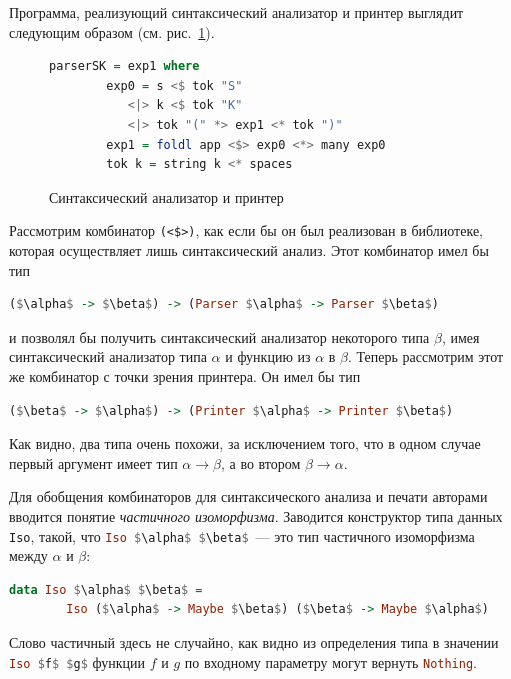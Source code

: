 Программа, реализующий синтаксический анализатор и принтер выглядит следующим образом (см. рис.~\ref{ppimpl}).

\begin{figure}[h]
\centering
\begin{lstlisting}[language=Haskell]
    parserSK = exp1 where
        exp0 = s <$ tok "S"
           <|> k <$ tok "K" 
           <|> tok "(" *> exp1 <* tok ")"
        exp1 = foldl app <$> exp0 <*> many exp0
        tok k = string k <* spaces    
\end{lstlisting}
\caption{Синтаксический анализатор и принтер}
\label{ppimpl}
\end{figure}

Рассмотрим комбинатор \lstinline{(<$>)}, как если бы он был реализован в библиотеке, 
которая осуществляет лишь синтаксический анализ. Этот комбинатор имел бы тип

\begin{lstlisting}[language=Haskell,mathescape]
   ($\alpha$ -> $\beta$) -> (Parser $\alpha$ -> Parser $\beta$)
\end{lstlisting}

\noindent и позволял бы получить синтаксический анализатор некоторого типа $\beta$, имея 
синтаксический анализатор типа $\alpha$ и функцию из $\alpha$ в $\beta$. Теперь 
рассмотрим этот же комбинатор с точки зрения принтера. Он имел бы тип 

\begin{lstlisting}[language=Haskell,mathescape]
   ($\beta$ -> $\alpha$) -> (Printer $\alpha$ -> Printer $\beta$)
\end{lstlisting}

Как видно, два типа очень похожи, за исключением того, что в одном случае первый аргумент имеет тип $\alpha \rightarrow \beta$, 
а во втором $\beta \rightarrow \alpha$.

Для обобщения комбинаторов для синтаксического анализа и печати авторами вводится понятие \emph{частичного изоморфизма}. 
Заводится конструктор типа данных \lstinline{Iso}, такой, что \lstinline[language=Haskell,mathescape]{Iso $\alpha$ $\beta$}~---
это тип частичного изоморфизма между $\alpha$ и $\beta$:

\begin{lstlisting}[mathescape,language=Haskell]
   data Iso $\alpha$ $\beta$ =
        Iso ($\alpha$ -> Maybe $\beta$) ($\beta$ -> Maybe $\alpha$)
\end{lstlisting}

Слово частичный здесь не случайно, как видно из определения типа в значении \lstinline[language=Haskell,mathescape]{Iso $f$ $g$}
функции $f$ и $g$ по входному параметру могут вернуть \lstinline[language=Haskell]{Nothing}. 

